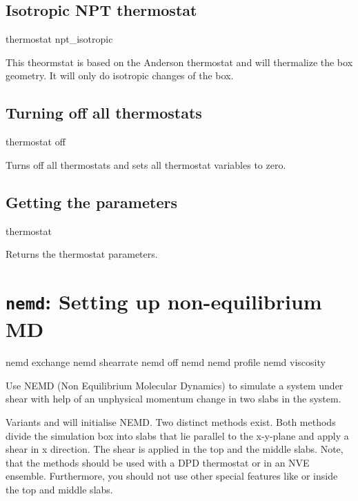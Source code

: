 \subsection{Isotropic NPT thermostat}
\begin{essyntax}
  thermostat npt_isotropic   
\end{essyntax}

This theormstat is based on the Anderson thermostat and will
thermalize the box geometry. It will only do isotropic changes of the
box.

\subsection{Turning off all thermostats}
\begin{essyntax}
  thermostat off
\end{essyntax}

Turns off all thermostats and sets all thermostat variables to zero.

\subsection{Getting the parameters}
\begin{essyntax}
  thermostat
\end{essyntax}

Returns the thermostat parameters. 

\section{\texttt{nemd}: Setting up non-equilibrium MD}


\begin{essyntax}
  nemd exchange  
  nemd shearrate  
  nemd off
  nemd
  nemd profile
  nemd viscosity
\end{essyntax}
Use NEMD (Non Equilibrium Molecular Dynamics) to simulate a system
under shear with help of an unphysical momentum change in two slabs in
the system.

Variants  and  will initialise NEMD. Two
distinct methods exist.  Both methods divide the simulation box into
 slabs that lie parallel to the x-y-plane and apply a
shear in x direction.  The shear is applied in the top and the middle
slabs. Note, that the methods should be used with a DPD thermostat or
in an NVE ensemble.  Furthermore, you should not use other special
features like  or  inside the
top and middle slabs.

